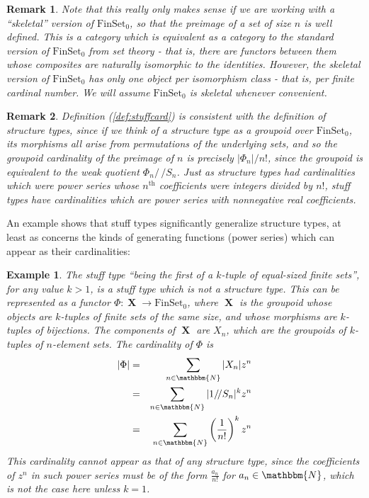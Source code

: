\documentclass{amsart} \usepackage{amsmath,amssymb,bbm}
\newcommand{\opname}[1]{\operatorname{#1}}
\newcommand{\catname}[1]{\boldsymbol{\opname{{#1}}}}
\newcommand{\FSN}{\catname{FinSet_0}}
\newtheorem{varexample}{Example}
\newenvironment{example}{\begin{varexample}\em}{\em\end{varexample}}
\newtheorem{varremark}{Remark}
\newenvironment{remark}{\begin{varremark}\em}{\em\end{varremark}}
\begin{document}
\begin{remark}
  Note that this really only makes sense if we are working with a
  ``skeletal'' version of $\FSN$, so that the preimage of a set of
  size $n$ is well defined.  This is a category which is equivalent as
  a category to the standard version of $\FSN$ from set theory - that
  is, there are functors between them whose composites are naturally
  isomorphic to the identities.  However, the skeletal version of
  $\FSN$ has only one object per isomorphism class - that is, per
  finite cardinal number.  We will assume $\FSN$ is skeletal whenever
  convenient.
\end{remark}

\begin{remark}
  Definition (\ref{def:stuffcard}) is consistent with the definition
  of structure types, since if we think of a structure type as a
  groupoid over $\FSN$, its morphisms all arise from permutations of
  the underlying sets, and so the groupoid cardinality of the preimage
  of $n$ is precisely $| \Phi_n | / n!$, since the groupoid is
  equivalent to the weak quotient $\Phi_n /\,\!\!/ S_n$.  Just as
  structure types had cardinalities which were power series whose
  $n^{\opname{th}}$ coefficients were integers divided by $n!$, stuff
  types have cardinalities which are power series with nonnegative
  real coefficients.
\end{remark}

An example shows that stuff types significantly generalize structure types, at
least as concerns the kinds of generating functions (power series) which can
appear as their cardinalities:

\begin{example}
  The stuff type ``being the first of a $k$-tuple of equal-sized
  finite sets'', for any value $k > 1$, is a stuff type which is not a
  structure type.  This can be represented as a functor $\Phi : \catname{X}
  \rightarrow \FSN$, where $\catname{X}$ is the groupoid whose
  objects are $k$-tuples of finite sets of the same size, and whose
  morphisms are $k$-tuples of bijections.  The components of $\catname{X}$ are
  $X_n$, which are the groupoids of $k$-tuples of $n$-element sets.  The
  cardinality of $\Phi$ is
  \begin{eqnarray}
     | \Phi | & = & \sum_{n \in \mathbbm{N}} |X_n |z^n\\
     \nonumber & = & \sum_{n \in \mathbbm{N}} | 1 /\,\!\!/ S_n |^k z^n\\
     \nonumber & = & \sum_{n \in \mathbbm{N}} \left( \frac{1}{n!} \right)^k z^n
  \end{eqnarray}
  This cardinality cannot appear as that of any structure type, since the
  coefficients of $z^n$ in such power series must be of the form
  $\frac{a_n}{n!}$ for $a_n \in \mathbbm{N}$, which is not the case here
  unless $k = 1$.
\end{example}
\end{document}
